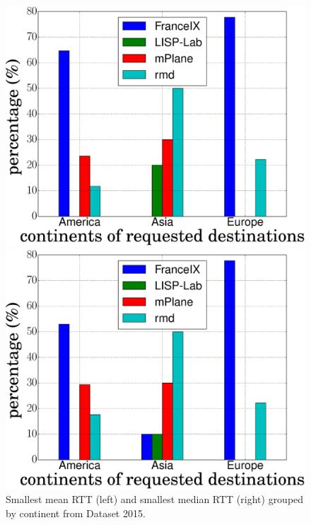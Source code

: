 \begin{figure}[!t]
	\begin{minipage}[c]{.49\linewidth}
		\begin{center}
			\includegraphics[width=.9\linewidth]{Pics/2015/4_probes_to_alexa_top50_proportion_mean_bar_geo.eps}
		\end{center}
	\end{minipage}
	\begin{minipage}[c]{.49\linewidth}
		\begin{center}
			\includegraphics[width=.9\linewidth]{Pics/2015/4_probes_to_alexa_top50_proportion_median_bar_geo.eps}
		\end{center}
	\end{minipage}
	\caption{Smallest mean RTT (left) and smallest median RTT (right) grouped by continent from Dataset 2015.}
	\label{4_probes_to_alexa_top50_proportion_bar_geo}
\end{figure}
	
